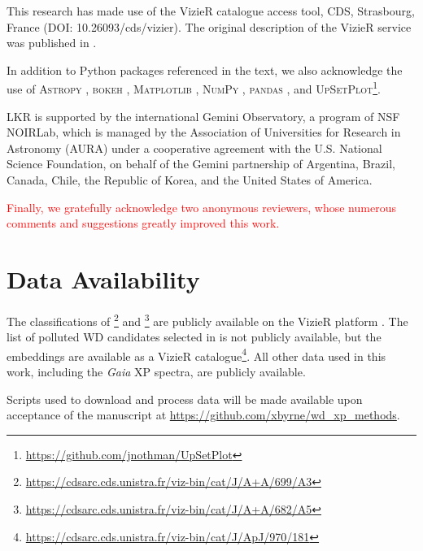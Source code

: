 \documentclass[fleqn,usenatbib]{rasti}
\newcommand{\red}[1]{\textcolor{red}{#1}}
\begin{document}
This research has made use of the VizieR catalogue access tool, CDS, Strasbourg, France (DOI: 10.26093/cds/vizier).
The original description of the VizieR service was published in \citet{ochsenbein00}.

In addition to Python packages referenced in the text, we also acknowledge the use of \textsc{Astropy} \citep{astropy1, astropy2, astropy3}, \textsc{bokeh} \citep{bokeh}, \textsc{Matplotlib} \citep{matplotlib}, \textsc{NumPy} \citep{numpy}, \textsc{pandas} \citep{pandas1, pandas2}, and \textsc{UpSetPlot}\footnote{\url{https://github.com/jnothman/UpSetPlot}}.

LKR is supported by the international Gemini Observatory, a program of NSF NOIRLab, which is managed by the Association of Universities for Research in Astronomy (AURA) under a cooperative agreement with the U.S. National Science Foundation, on behalf of the Gemini partnership of Argentina, Brazil, Canada, Chile, the Republic of Korea, and the United States of America.

\red{Finally, we gratefully acknowledge two anonymous reviewers, whose numerous comments and suggestions greatly improved this work.}

\section*{Data Availability}

The classifications of \citet{garciazamora25}\footnote{
    \url{https://cdsarc.cds.unistra.fr/viz-bin/cat/J/A+A/699/A3}
} and \citet{vincent24}\footnote{
    \url{https://cdsarc.cds.unistra.fr/viz-bin/cat/J/A+A/682/A5}
} are publicly available on the VizieR platform \citep{ochsenbein00}.
The list of polluted WD candidates selected in \citet{kao24} is not publicly available, but the embeddings are available as a VizieR catalogue\footnote{
    \url{https://cdsarc.cds.unistra.fr/viz-bin/cat/J/ApJ/970/181}
}.
All other data used in this work, including the \textit{Gaia} XP spectra, are publicly available.

Scripts used to download and process data will be made available upon acceptance of the manuscript at
\url{https://github.com/xbyrne/wd_xp_methods}.



\end{document}
